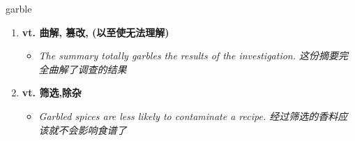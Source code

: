 
\begin{frame}
{\huge garble}
\begin{center}
\begin{enumerate}\Large
  \item \textbf{vt. 曲解, 篡改, (以至使无法理解)}
  \begin{itemize}
    \item \em{\Large{The summary totally garbles the results of the investigation. 这份摘要完全曲解了调查的结果}}
  \end{itemize}
  \item \textbf{vt. 筛选,除杂}
  \begin{itemize}
    \item \em{\Large{Garbled spices are less likely to contaminate a recipe. 经过筛选的香料应该就不会影响食谱了}}
  \end{itemize}
\end{enumerate}
\end{center}
\end{frame}
